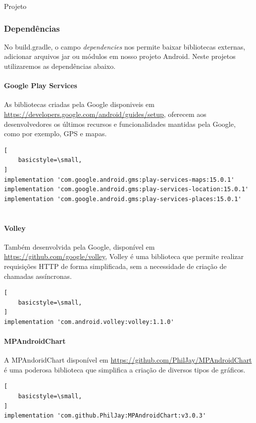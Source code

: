 \documentclass[
	12pt,				%
	openright,			%
	twoside,			%
	a4paper,			%
	english,			%
	french,				%
	spanish,			%
	brazil				%
	]{abntex2}
\begin{document}
\begin{chapter}{Projeto}
\subsubsection{Dependências}
 No build.gradle, o campo \textit{dependencies} nos permite baixar bibliotecas externas, adicionar arquivos jar ou módulos em nosso projeto Android. Neste projetos utilizaremos as dependências abaixo.
\\
 
   \paragraph{Google Play Services}
   As bibliotecas criadas pela Google disponiveis em \url{https://developers.google.com/android/guides/setup}, oferecem aos desenvolvedores os últimos recursos e funcionalidades mantidas pela Google, como por exemplo, GPS e mapas.
       \begin{lstlisting}[
    basicstyle=\small,
] 
implementation 'com.google.android.gms:play-services-maps:15.0.1'
implementation 'com.google.android.gms:play-services-location:15.0.1'
implementation 'com.google.android.gms:play-services-places:15.0.1'
  
\end{lstlisting}

   \paragraph{Volley}
   Também desenvolvida pela Google, disponível em \url{https://github.com/google/volley}, Volley é uma biblioteca que permite realizar requisições HTTP de forma simplificada, sem a necessidade de criação de chamadas assíncronas.
       \begin{lstlisting}[
    basicstyle=\small,
]
implementation 'com.android.volley:volley:1.1.0'  
\end{lstlisting}

   \paragraph{MPAndroidChart}
   A  MPAndoridChart disponível em \url{https://github.com/PhilJay/MPAndroidChart} é uma poderosa biblioteca que simplifica a criação de diversos tipos de gráficos. 
        \begin{lstlisting}[
    basicstyle=\small,
] 
implementation 'com.github.PhilJay:MPAndroidChart:v3.0.3'
  
\end{lstlisting}

\end{chapter}
\end{document}
